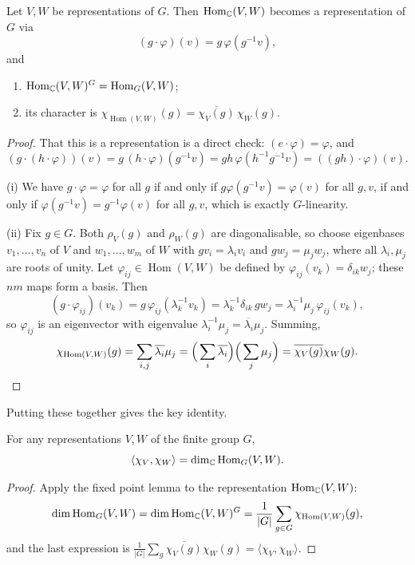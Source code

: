\documentclass[a4paper]{scrartcl}
\newcommand{\Hom}{\operatorname{Hom}}
\newcommand{\ip}[2]{\langle #1, #2 \rangle}
\begin{document}
\begin{lemma}
	Let $V, W$ be representations of $G$. Then $\Hom_\C(V,W)$ becomes a representation of $G$ via
	$$(g\cdot \varphi)(v) = g\,\varphi(g^{-1}v),$$
	and
	\begin{enumerate}[label=(\roman*)]
		\item $\Hom_\C(V,W)^G = \Hom_G(V,W)$;
		\item its character is $\chi_{\Hom(V,W)}(g) = \overline{\chi_V(g)}\,\chi_W(g)$.
	\end{enumerate}
\end{lemma}
\begin{proof}
	That this is a representation is a direct check: $(e\cdot\varphi) = \varphi$, and
	$$(g\cdot(h\cdot\varphi))(v) = g\,(h\cdot\varphi)(g^{-1}v) = gh\,\varphi(h^{-1}g^{-1}v) = ((gh)\cdot\varphi)(v).$$

	(i) We have $g\cdot\varphi = \varphi$ for all $g$ if and only if $g\varphi(g^{-1}v) = \varphi(v)$ for all $g, v$, if and only if $\varphi(g^{-1}v) = g^{-1}\varphi(v)$ for all $g,v$, which is exactly $G$-linearity.

	(ii) Fix $g \in G$. Both $\rho_V(g)$ and $\rho_W(g)$ are diagonalisable, so choose eigenbases $v_1, \dots, v_n$ of $V$ and $w_1, \dots, w_m$ of $W$ with $gv_i = \lambda_i v_i$ and $gw_j = \mu_j w_j$, where all $\lambda_i, \mu_j$ are roots of unity. Let $\varphi_{ij} \in \Hom(V,W)$ be defined by $\varphi_{ij}(v_k) = \delta_{ik}w_j$; these $nm$ maps form a basis. Then
	$$(g\cdot\varphi_{ij})(v_k) = g\,\varphi_{ij}(\lambda_k^{-1}v_k) = \lambda_k^{-1}\delta_{ik}\, gw_j = \lambda_i^{-1}\mu_j\,\varphi_{ij}(v_k),$$
	so $\varphi_{ij}$ is an eigenvector with eigenvalue $\lambda_i^{-1}\mu_j = \overline{\lambda_i}\mu_j$. Summing,
	$$\chi_{\Hom(V,W)}(g) = \sum_{i,j}\overline{\lambda_i}\mu_j = \Big(\sum_i \overline{\lambda_i}\Big)\Big(\sum_j \mu_j\Big) = \overline{\chi_V(g)}\chi_W(g). \qedhere$$
\end{proof}

Putting these together gives the key identity.

\begin{theorem}
	For any representations $V, W$ of the finite group $G$,
	$$\ip{\chi_V}{\chi_W} = \dim_\C \Hom_G(V,W).$$
\end{theorem}
\begin{proof}
	Apply the fixed point lemma to the representation $\Hom_\C(V,W)$:
	$$\dim \Hom_G(V,W) = \dim \Hom_\C(V,W)^G = \frac1{|G|}\sum_{g\in G}\chi_{\Hom(V,W)}(g),$$
	and the last expression is $\frac1{|G|}\sum_{g} \overline{\chi_V(g)}\chi_W(g) = \ip{\chi_V}{\chi_W}$.
\end{proof}
\end{document}
